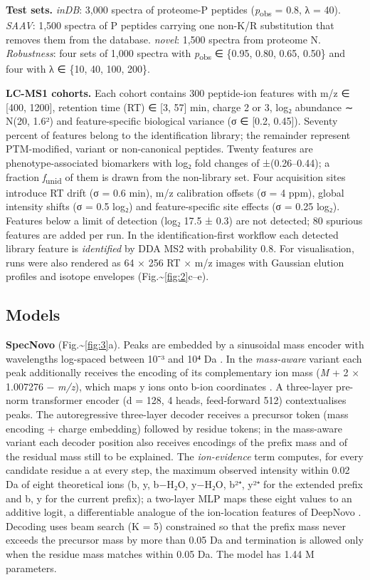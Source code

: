 \documentclass{sn-preview}
\begin{document}
\textbf{Test sets.} \emph{inDB}: 3,000 spectra of proteome-P peptides (\emph{p}\textsubscript{obs} = 0.8, λ = 40). \emph{SAAV}: 1,500 spectra of P peptides carrying one non-K/R substitution that removes them from the database. \emph{novel}: 1,500 spectra from proteome N. \emph{Robustness}: four sets of 1,000 spectra with \emph{p}\textsubscript{obs} ∈ \{0.95, 0.80, 0.65, 0.50\} and four with λ ∈ \{10, 40, 100, 200\}.

\textbf{LC-MS1 cohorts.} Each cohort contains 300 peptide-ion features with m/z ∈ {[}400, 1200{]}, retention time (RT) ∈ {[}3, 57{]} min, charge 2 or 3, log₂ abundance ∼ N(20, 1.6²) and feature-specific biological variance (σ ∈ {[}0.2, 0.45{]}). Seventy percent of features belong to the identification library; the remainder represent PTM-modified, variant or non-canonical peptides. Twenty features are phenotype-associated biomarkers with log₂ fold changes of ±(0.26--0.44); a fraction \emph{f}\textsubscript{unid} of them is drawn from the non-library set. Four acquisition sites introduce RT drift (σ = 0.6 min), m/z calibration offsets (σ = 4 ppm), global intensity shifts (σ = 0.5 log₂) and feature-specific site effects (σ = 0.25 log₂). Features below a limit of detection (log₂ 17.5 ± 0.3) are not detected; 80 spurious features are added per run. In the identification-first workflow each detected library feature is \emph{identified} by DDA MS2 with probability 0.8. For visualisation, runs were also rendered as 64 × 256 RT × m/z images with Gaussian elution profiles and isotope envelopes (Fig.\textasciitilde{}\ref{fig:2}c--e).

\subsection{Models}

\textbf{SpecNovo} (Fig.\textasciitilde{}\ref{fig:3}a). Peaks are embedded by a sinusoidal mass encoder with wavelengths log-spaced between 10⁻³ and 10⁴ Da \cite{yilmaz2024}. In the \emph{mass-aware} variant each peak additionally receives the encoding of its complementary ion mass (\emph{M} + 2 × 1.007276 − \emph{m/z}), which maps y ions onto b-ion coordinates \cite{yang2024}. A three-layer pre-norm transformer encoder (d = 128, 4 heads, feed-forward 512) contextualises peaks. The autoregressive three-layer decoder receives a precursor token (mass encoding + charge embedding) followed by residue tokens; in the mass-aware variant each decoder position also receives encodings of the prefix mass and of the residual mass still to be explained. The \emph{ion-evidence} term computes, for every candidate residue a at every step, the maximum observed intensity within 0.02 Da of eight theoretical ions (b, y, b−H₂O, y−H₂O, b²⁺, y²⁺ for the extended prefix and b, y for the current prefix); a two-layer MLP maps these eight values to an additive logit, a differentiable analogue of the ion-location features of DeepNovo \cite{tran2017}. Decoding uses beam search (K = 5) constrained so that the prefix mass never exceeds the precursor mass by more than 0.05 Da and termination is allowed only when the residue mass matches within 0.05 Da. The model has 1.44 M parameters.
\end{document}
